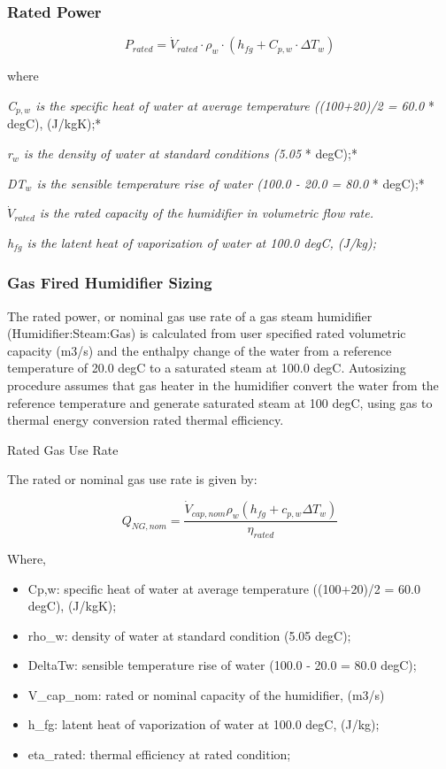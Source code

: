 \subsubsection{Rated Power}\label{rated-power}

\begin{equation}
{P_{rated}} = {\dot V_{rated}} \cdot {\rho_w} \cdot \left( {{h_{fg}} + {C_{p,w}} \cdot \Delta {T_w}} \right)
\end{equation}

where

\emph{C\(_{p,w}\) is the specific heat of water at average temperature ((100+20)/2 = 60.0} * degC), (J/kgK);*

\emph{r\(_{w}\) is the density of water at standard conditions (5.05} * degC);*

\emph{DT\(_{w}\) is the sensible temperature rise of water (100.0 - 20.0 = 80.0} * degC);*

\emph{\({\dot V_{rated}}\) is the rated capacity of the humidifier in volumetric flow rate.}

\emph{h\(_{fg}\) is the latent heat of vaporization of water at 100.0 degC, (J/kg);}

\subsubsection{Gas Fired Humidifier Sizing}\label{gas-fired-humidifier-sizing}

The rated power, or nominal gas use rate of a gas steam humidifier (Humidifier:Steam:Gas) is calculated from user specified rated volumetric capacity (m3/s) and the enthalpy change of the water from a reference temperature of 20.0 degC to a saturated steam at 100.0 degC. Autosizing procedure assumes that gas heater in the humidifier convert the water from the reference temperature and generate saturated steam at 100 degC, using gas to thermal energy conversion rated thermal efficiency.

Rated Gas Use Rate

The rated or nominal gas use rate is given by:

\begin{equation}
Q_{NG,nom} = \frac{\dot{V}_{cap,nom}\rho_w\left(h_{fg}+c_{p,w}\Delta T_w\right)}{\eta_{rated}}
\end{equation}

Where,

\begin{itemize}
\item
  Cp,w: specific heat of water at average temperature ((100+20)/2 = 60.0 degC), (J/kgK);
\item
  rho\_w: density of water at standard condition (5.05 degC);
\item
  DeltaTw: sensible temperature rise of water (100.0 - 20.0 = 80.0 degC);
\item
  V\_cap\_nom: rated or nominal capacity of the humidifier, (m3/s)
\item
  h\_fg: latent heat of vaporization of water at 100.0 degC, (J/kg);
\item
  eta\_rated: thermal efficiency at rated condition;
\end{itemize}

